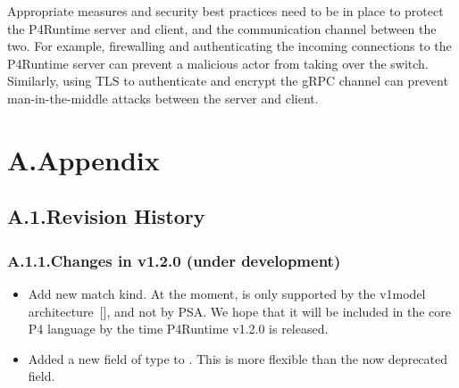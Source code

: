 \documentclass[11pt]{article}
\begin{document}
{%
\noindent{}Appropriate measures and security best practices need to be in place to protect
the P4Runtime server and client, and the communication channel between the two.
For example, firewalling and authenticating the incoming connections to the
P4Runtime server can prevent a malicious actor from taking over the switch.
Similarly, using TLS to authenticate and encrypt the gRPC channel can prevent
man-in-the-middle attacks between the server and client.%

\section{A.\hspace*{0.5em}Appendix}\label{sec-appendix}%

\subsection{A.1.\hspace*{0.5em}Revision History}\label{sec-revision-history}%

\subsubsection{A.1.1.\hspace*{0.5em}Changes in v1.2.0 (under development)}\label{sec-changes-in-v120-under-development}%

\begin{itemize}[noitemsep,topsep=\mdcompacttopsep]%

\item{}Add new  match kind. At the moment,  is only supported by
the v1model architecture~[], and not by PSA. We hope that it will be
included in the core P4 language by the time P4Runtime v1.2.0 is released.%

\item{}Added a new  field of type  to . This is more
flexible than the now deprecated  field.%


\end{itemize}}
\end{document}
